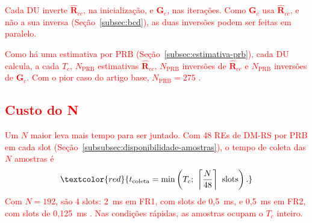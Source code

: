 
\textcolor{red}{Cada DU inverte $\hat{\mathbf{R}}_{cc}$, na inicialização, e $\mathbf{G}_c$, nas iterações. Como $\mathbf{G}_c$ usa $\hat{\mathbf{R}}_{cc}$, e não a sua inversa (Seção~\ref{subsec:bcd}), as duas inversões podem ser feitas em paralelo.}

\textcolor{red}{Como há uma estimativa por PRB (Seção~{\hypersetup{linkcolor=red}\ref{subsec:estimativa-prb}}), cada DU calcula, a cada $T_c$, $N_{\text{PRB}}$ estimativas $\hat{\mathbf{R}}_{cc}$, $N_{\text{PRB}}$ inversões de $\hat{\mathbf{R}}_{cc}$ e $N_{\text{PRB}}$ inversões de $\mathbf{G}_c$. Com o pior caso do artigo base, $N_{\text{PRB}} = 275$ \cite{zhao2025jsac}.}


\subsection{\texorpdfstring{\textcolor{red}{Custo do N}}{Custo do N}}


\textcolor{red}{Um $N$ maior leva mais tempo para ser juntado. Com 48 REs de DM-RS por PRB em cada slot (Seção~\ref{subsubsec:disponibilidade-amostras}), o tempo de coleta das $N$ amostras é}
\begin{equation*}
\textcolor{red}{t_{\text{coleta}} = \min\left(T_c;\ \left\lceil \frac{N}{48} \right\rceil \text{ slots}\right).}
\end{equation*}
\textcolor{red}{Com $N = 192$, são 4 slots: 2~ms em FR1, com slots de 0,5~ms, e 0,5~ms em FR2, com slots de 0,125~ms \cite[Tab.~4.3.2-1]{3gpp-ts38211}. Nas condições rápidas, as amostras ocupam o $T_c$ inteiro.}

